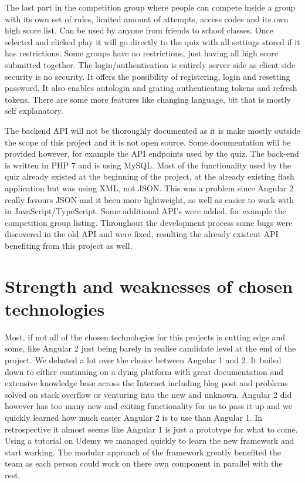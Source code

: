 The last part in the competition group where people can compete inside a group with its own set of rules, limited amount of attempts, access codes and its own high score list. Can be used by anyone from friends to school classes. Once selected and clicked play it will go directly to the quiz with all settings stored if it has restrictions. Some groups have no restrictions, just having all high score submitted together. The login/authentication is entirely server side as client side security is no security. It offers the possibility of registering, login and resetting password. It also enables autologin and grating authenticating tokens and refresh tokens. There are some more features like  changing language, bit that is mostly self explanatory. 


The backend API will not be thoroughly documented as it is make mostly outside the scope of this project and it is not open source. Some documentation will be provided however, for example the API endpoints used by the quiz. The back-end is written in PHP 7 and is using MySQL. Most of the functionality used by the quiz already existed at the beginning of the project, at the already existing flash application but was using XML, not JSON. This was a problem since Angular 2 really favours JSON and it been more lightweight, as well as easier to work with in JavaScript/TypeScript. Some additional API's were added, for example the competition group listing. Throughout the development process some bugs were discovered in the old API  and were fixed, resulting  the already existent API benefiting from this project as well. 


\section{Strength and weaknesses of chosen technologies}
\label{sec:stregthandwic}
Most, if not all of the chosen technologies for this projects is cutting edge and some, like Angular 2 just being  barely in realise candidate level at the end of the project. We debated a lot over the choice between Angular 1 and 2. It boiled down to either continuing on a dying platform with great documentation and extensive knowledge base across the Internet including blog post and problems solved on stack overflow or venturing into the new and unknown. Angular 2 did however has too many new and exiting functionality for us to pass it up and we quickly learned how much easier Angular 2 is to use than Angular 1. In retrospective it almost seems like Angular 1 is just a prototype for what to come. Using a tutorial on Udemy \cite{TheCo73:online} we managed quickly to learn the new framework and start working. The modular approach of the framework greatly benefited the team as each person could work on there own component in parallel with the rest.

